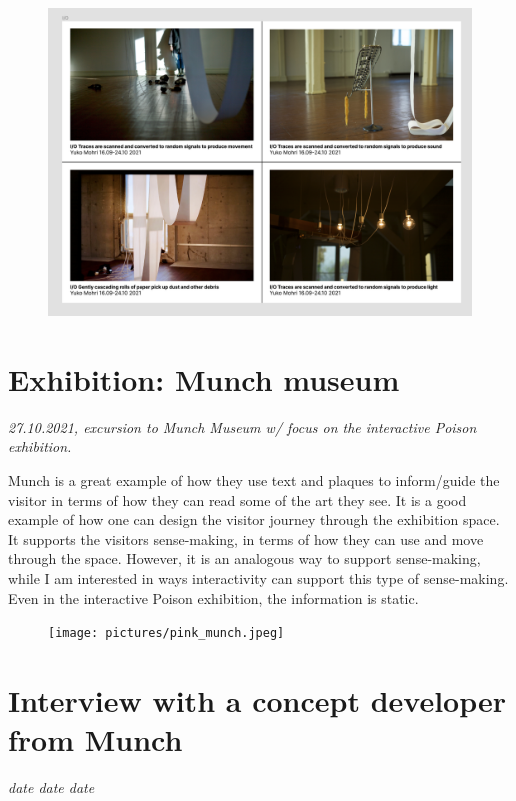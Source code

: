 \begin{figure}[H]
\includegraphics[width=15cm]{pictures/yukomohri.png}
\centering 
\end{figure}

\section{Exhibition: Munch museum}
\par
\emph{27.10.2021, excursion to Munch Museum w/ focus on the interactive Poison exhibition.}
\par

Munch is a great example of how they use text and plaques to inform/guide the visitor in terms of how they can read some of the art they see. It is a good example of how one can design the visitor journey through the exhibition space. It supports the visitors sense-making, in terms of how they can use and move through the space. However, it is an analogous way to support sense-making, while I am interested in ways interactivity can support this type of sense-making. Even in the interactive Poison exhibition, the information is static.

\begin{figure}[h]
\texttt{[image: pictures/pink\_munch.jpeg]}
\centering 
\end{figure}

\section{Interview with a concept developer from Munch}
\par
\emph{date date date}
\par

